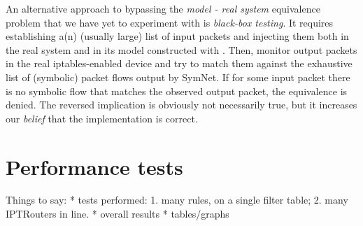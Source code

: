 An alternative approach to bypassing the \emph{model - real system} equivalence
problem that we have yet to experiment with is \emph{black-box testing}.  It
requires establishing a(n) (usually large) list of input packets and injecting
them both in the real system and in its model constructed with \TOOL.  Then,
monitor output packets in the real iptables-enabled device and try to match
them against the exhaustive list of (symbolic) packet flows output by SymNet.
If for some input packet there is no symbolic flow that matches the observed
output packet, the equivalence is denied.  The reversed implication is
obviously not necessarily true, but it increases our \emph{belief} that the
implementation is correct.


\section{Performance tests}

Things to say:
* tests performed:
1. many rules, on a single filter table;
2. many IPTRouters in line.
* overall results
* tables/graphs

